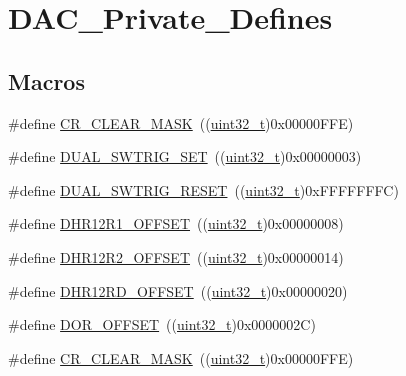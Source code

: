 \hypertarget{group___d_a_c___private___defines}{}\section{D\+A\+C\+\_\+\+Private\+\_\+\+Defines}
\label{group___d_a_c___private___defines}
\subsection*{Macros}
\begin{DoxyCompactItemize}
\item 
\#define \hyperlink{group___d_a_c___private___defines_ga8a5812a1d5ced986bb997a4bb7ae697d}{C\+R\+\_\+\+C\+L\+E\+A\+R\+\_\+\+M\+A\+SK}~((\hyperlink{_p_e___types_8h_a33594304e786b158f3fb30289278f5af}{uint32\+\_\+t})0x00000\+F\+F\+E)
\item 
\#define \hyperlink{group___d_a_c___private___defines_ga6401668f65168b2b689b49155f380bdd}{D\+U\+A\+L\+\_\+\+S\+W\+T\+R\+I\+G\+\_\+\+S\+ET}~((\hyperlink{_p_e___types_8h_a33594304e786b158f3fb30289278f5af}{uint32\+\_\+t})0x00000003)
\item 
\#define \hyperlink{group___d_a_c___private___defines_gacd3ce00f8b25892532af267f26932ed7}{D\+U\+A\+L\+\_\+\+S\+W\+T\+R\+I\+G\+\_\+\+R\+E\+S\+ET}~((\hyperlink{_p_e___types_8h_a33594304e786b158f3fb30289278f5af}{uint32\+\_\+t})0x\+F\+F\+F\+F\+F\+F\+F\+C)
\item 
\#define \hyperlink{group___d_a_c___private___defines_gaf1305e3b7cfb0f898678baeab6e91cbf}{D\+H\+R12\+R1\+\_\+\+O\+F\+F\+S\+ET}~((\hyperlink{_p_e___types_8h_a33594304e786b158f3fb30289278f5af}{uint32\+\_\+t})0x00000008)
\item 
\#define \hyperlink{group___d_a_c___private___defines_ga157b0fbccea090637eea09172fdd6a39}{D\+H\+R12\+R2\+\_\+\+O\+F\+F\+S\+ET}~((\hyperlink{_p_e___types_8h_a33594304e786b158f3fb30289278f5af}{uint32\+\_\+t})0x00000014)
\item 
\#define \hyperlink{group___d_a_c___private___defines_ga2893b0491ec29a95fd061e5e0fa029e3}{D\+H\+R12\+R\+D\+\_\+\+O\+F\+F\+S\+ET}~((\hyperlink{_p_e___types_8h_a33594304e786b158f3fb30289278f5af}{uint32\+\_\+t})0x00000020)
\item 
\#define \hyperlink{group___d_a_c___private___defines_ga051bab7263211bd232d13665339c1745}{D\+O\+R\+\_\+\+O\+F\+F\+S\+ET}~((\hyperlink{_p_e___types_8h_a33594304e786b158f3fb30289278f5af}{uint32\+\_\+t})0x0000002\+C)
\item 
\#define \hyperlink{group___d_a_c___private___defines_ga8a5812a1d5ced986bb997a4bb7ae697d}{C\+R\+\_\+\+C\+L\+E\+A\+R\+\_\+\+M\+A\+SK}~((\hyperlink{_p_e___types_8h_a33594304e786b158f3fb30289278f5af}{uint32\+\_\+t})0x00000\+F\+F\+E)

\end{DoxyCompactItemize}
